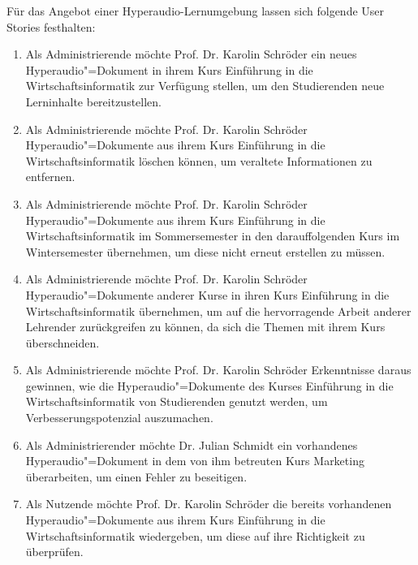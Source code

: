 Für das Angebot einer Hyperaudio-Lernumgebung lassen sich folgende User Stories festhalten:

\begin{enumerate}[leftmargin=1.3cm,label=US-\arabic*:,ref=US-\arabic*]

\item \label{US-Admin-Erstellen} Als Administrierende möchte Prof. Dr. Karolin Schröder ein neues Hyperaudio"=Dokument in ihrem Kurs \glqq Einführung in die Wirtschaftsinformatik\grqq{} zur Verfügung stellen, um den Studierenden neue Lerninhalte bereitzustellen.

\item \label{US-Admin-Loeschen} Als Administrierende möchte Prof. Dr. Karolin Schröder Hyperaudio"=Dokumente aus ihrem Kurs \glqq Einführung in die Wirtschaftsinformatik\grqq{} löschen können, um veraltete Informationen zu entfernen.

\item \label{US-Admin-Semester} Als Administrierende möchte Prof. Dr. Karolin Schröder Hyperaudio"=Dokumente aus ihrem Kurs \glqq Einführung in die Wirtschaftsinformatik\grqq{} im Sommersemester in den darauffolgenden Kurs im Wintersemester übernehmen, um diese nicht erneut erstellen zu müssen.

\item \label{US-Admin-Kurs} Als Administrierende möchte Prof. Dr. Karolin Schröder Hyperaudio"=Dokumente anderer Kurse in ihren Kurs \glqq Einführung in die Wirtschaftsinformatik\grqq{} übernehmen, um auf die hervorragende Arbeit anderer Lehrender zurückgreifen zu können, da sich die Themen mit ihrem Kurs überschneiden.

\item \label{US-Admin-Statistik} Als Administrierende möchte Prof. Dr. Karolin Schröder Erkenntnisse daraus gewinnen, wie die Hyperaudio"=Dokumente des Kurses \glqq Einführung in die Wirtschaftsinformatik\grqq{} von Studierenden genutzt werden, um Verbesserungspotenzial auszumachen.

\item \label{US-Admin-Bearbeiten} Als Administrierender möchte Dr. Julian Schmidt ein vorhandenes Hyperaudio"=Dokument in dem von ihm betreuten Kurs \glqq Marketing\grqq{} überarbeiten, um einen Fehler zu beseitigen.

\item \label{US-Wiedergabe} Als Nutzende möchte Prof. Dr. Karolin Schröder die bereits vorhandenen Hyperaudio"=Dokumente aus ihrem Kurs \glqq Einführung in die Wirtschaftsinformatik\grqq{} wiedergeben, um diese auf ihre Richtigkeit zu überprüfen.


\end{enumerate}
